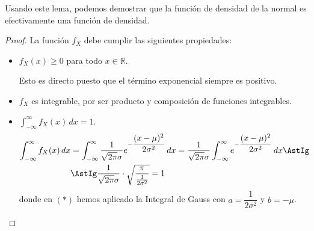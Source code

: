 Usando este lema, podemos demostrar que la función de densidad de la normal es efectivamente una función de densidad.
\begin{proof}
    La función $f_X$ debe cumplir las siguientes propiedades:
    \begin{itemize}
        \item $f_X(x)\geq 0$ para todo $x\in \mathbb{R}$.
        
        Esto es directo puesto que el término exponencial siempre es positivo.

        \item $f_X$ es integrable, por ser producto y composición de funciones integrables.
        
        \item $\displaystyle \int_{-\infty}^{\infty} f_X(x) \, dx = 1$.
        \begin{align*}
            \int_{-\infty}^{\infty} f_X(x) \, dx &= \int_{-\infty}^{\infty} \dfrac{1}{\sqrt{2\pi}\sigma} e^{-\dfrac{(x-\mu)^2}{2\sigma^2}} \, dx = \dfrac{1}{\sqrt{2\pi}\sigma} \int_{-\infty}^{\infty} e^{-\dfrac{(x-\mu)^2}{2\sigma^2}} \, dx \AstIg\\
            &\AstIg \dfrac{1}{\sqrt{2\pi}\sigma} \cdot \sqrt{\dfrac{\pi}{\frac{1}{2\sigma^2}}} = 1
        \end{align*}
        donde en $(\ast)$ hemos aplicado la Integral de Gauss con $a=\dfrac{1}{2\sigma^2}$ y $b=-\mu$.
    \end{itemize}
\end{proof}


